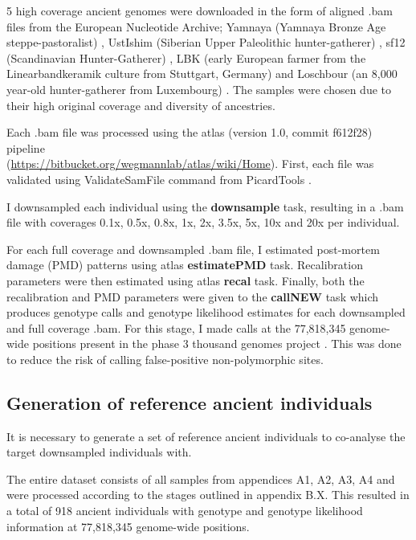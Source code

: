 5 high coverage ancient genomes were downloaded in the form of aligned .bam files from the European Nucleotide Archive; Yamnaya (Yamnaya Bronze Age steppe-pastoralist) \cite{deBarrosDamgaardeaar7711}, UstIshim (Siberian Upper Paleolithic hunter-gatherer) \cite{Fu2014}, sf12 (Scandinavian Hunter-Gatherer) \cite{Gunther2018a}, LBK (early European farmer from the Linearbandkeramik culture from Stuttgart, Germany) \cite{Lazaridis2014} and Loschbour (an 8,000 year-old hunter-gatherer from Luxembourg) \cite{Lazaridis2014}. The samples were chosen due to their high original coverage and diversity of ancestries. 

Each .bam file was processed using the atlas (version 1.0, commit f612f28) pipeline \cite{Link2017} \\(\url{https://bitbucket.org/wegmannlab/atlas/wiki/Home}). First, each file was validated using ValidateSamFile command from PicardTools \cite{Picard2018toolkit}. 

I downsampled each individual using the \textbf{downsample} task, resulting in a .bam file with coverages 0.1x, 0.5x, 0.8x, 1x, 2x, 3.5x, 5x, 10x and 20x per individual. 

For each full coverage and downsampled .bam file, I estimated post-mortem damage (PMD) patterns using atlas \textbf{estimatePMD} task. Recalibration parameters were then estimated using atlas \textbf{recal} task. Finally, both the recalibration and PMD parameters were given to the \textbf{callNEW} task which produces genotype calls and genotype likelihood estimates for each downsampled and full coverage .bam. For this stage, I made calls at the 77,818,345 genome-wide positions present in the phase 3 thousand genomes project \cite{1000GenomesProjectConsortium2015}. This was done to reduce the risk of calling false-positive non-polymorphic sites.

\subsection{Generation of reference ancient individuals}

It is necessary to generate a set of reference ancient individuals to co-analyse the target downsampled individuals with. 

The entire dataset consists of all samples from appendices A1, A2, A3, A4 and were processed according to the stages outlined in appendix B.X. This resulted in a total of 918 ancient individuals with genotype and genotype likelihood information at 77,818,345 genome-wide positions. 

